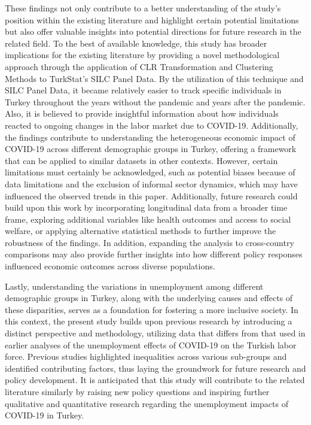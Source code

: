 \documentclass[a4paper,12pt]{article}
\begin{document}
These findings not only contribute to a better understanding of the study's position within the existing literature and highlight certain potential limitations but also offer valuable insights into potential directions for future research in the related field. To the best of available knowledge, this study has broader implications for the existing literature by providing a novel methodological approach through the application of CLR Transformation and Clustering Methods to TurkStat’s SILC Panel Data. By the utilization of this technique and SILC Panel Data, it became relatively easier to track specific individuals in Turkey throughout the years without the pandemic and years after the pandemic. Also, it is believed to provide insightful information about how individuals reacted to ongoing changes in the labor market due to COVID-19. Additionally,
the findings contribute to understanding the heterogeneous economic impact of COVID-19 across different demographic groups in Turkey, offering a framework that can be applied to similar datasets in other contexts. However, certain limitations must certainly be acknowledged, such as potential biases because of data limitations and the exclusion of informal sector dynamics, which may have influenced the observed trends in this paper. Additionally, future research could build upon this work by incorporating longitudinal data from a broader time frame, exploring additional variables like health outcomes and access to social welfare, or applying alternative statistical methods to further improve the robustness of the findings. In addition, expanding the analysis to cross-country comparisons may also provide further insights into how different policy responses influenced economic outcomes across diverse populations. 

Lastly, understanding the variations in unemployment among different demographic groups in Turkey, along with the underlying causes and effects of these disparities, serves as a foundation for fostering a more inclusive society. In this context, the present study builds upon previous research by introducing a distinct perspective and methodology, utilizing data that differs from that used in earlier analyses of the unemployment effects of COVID-19 on the Turkish labor force. Previous studies highlighted inequalities across various sub-groups and identified contributing factors, thus laying the groundwork for future research and policy development. It is anticipated that this study will contribute to the related literature similarly by raising new policy questions and inspiring further qualitative and quantitative research regarding the unemployment impacts of COVID-19 in Turkey.
\end{document}
